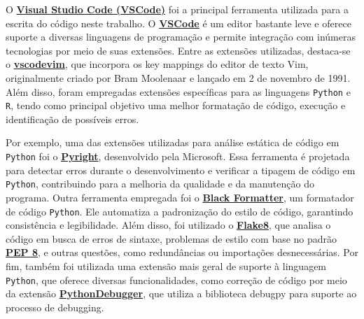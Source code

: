 \documentclass[
  12pt,
  a4paper,
]{scrreprt}
\begin{document}
\vspace{12pt}

O \href{https://code.visualstudio.com/}{\textbf{Visual Studio Code
(VSCode)}} foi a principal ferramenta utilizada para a escrita do código
neste trabalho. O \href{https://code.visualstudio.com/}{\textbf{VSCode}}
é um editor bastante leve e oferece suporte a diversas linguagens de
programação e permite integração com inúmeras tecnologias por meio de
suas extensões. Entre as extensões utilizadas, destaca-se o
\href{https://marketplace.visualstudio.com/items?itemName=vscodevim.vim}{\textbf{vscodevim}},
que incorpora os key mappings do editor de texto Vim, originalmente
criado por Bram Moolenaar e lançado em 2 de novembro de 1991. Além
disso, foram empregadas extensões específicas para as linguagens
\texttt{Python} e \texttt{R}, tendo como principal objetivo uma melhor
formatação de código, execução e identificação de possíveis erros.

\vspace{12pt}

Por exemplo, uma das extensões utilizadas para análise estática de
código em \texttt{Python} foi o
\href{https://marketplace.visualstudio.com/items?itemName=ms-pyright.pyright}{\textbf{Pyright}},
desenvolvido pela Microsoft. Essa ferramenta é projetada para detectar
erros durante o desenvolvimento e verificar a tipagem de código em
\texttt{Python}, contribuindo para a melhoria da qualidade e da
manutenção do programa. Outra ferramenta empregada foi o
\href{https://marketplace.visualstudio.com/items?itemName=ms-python.black-formatter}{\textbf{Black
Formatter}}, um formatador de código \texttt{Python}. Ele automatiza a
padronização do estilo de código, garantindo consistência e
legibilidade. Além disso, foi utilizado o
\href{https://marketplace.visualstudio.com/items?itemName=ms-python.flake8}{\textbf{Flake8}},
que analisa o código em busca de erros de sintaxe, problemas de estilo
com base no padrão \href{https://peps.python.org/pep-0008/}{\textbf{PEP
8}}, e outras questões, como redundâncias ou importações desnecessárias.
Por fim, também foi utilizada uma extensão mais geral de suporte à
linguagem \texttt{Python}, que oferece diversas funcionalidades, como
correção de código por meio da extensão
\href{https://marketplace.visualstudio.com/items?itemName=ms-python.debugpy}{\textbf{PythonDebugger}},
que utiliza a biblioteca debugpy para suporte ao processo de debugging.

\vspace{12pt}
\end{document}
